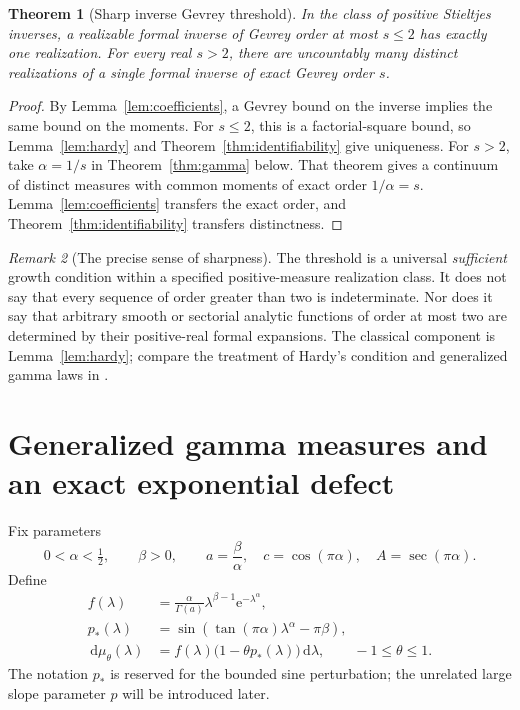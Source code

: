 \documentclass[11pt,a4paper]{article}
\numberwithin{equation}{section}
\newtheorem{theorem}{Theorem}[section]
\theoremstyle{definition}
\theoremstyle{remark}
\newtheorem{remark}[theorem]{Remark}
\newcommand{\dd}{\,\mathrm d}
\newcommand{\ee}{\mathrm e}
\begin{document}
\begin{theorem}[Sharp inverse Gevrey threshold]
\label{thm:gevrey}
In the class of positive Stieltjes inverses, a realizable formal inverse
of Gevrey order at most \(s\le2\) has exactly one realization.
For every real \(s>2\), there are uncountably many distinct realizations
of a single formal inverse of exact Gevrey order \(s\).
\end{theorem}
\begin{proof}
By Lemma~\ref{lem:coefficients}, a Gevrey bound on the inverse implies
the same bound on the moments. For \(s\le2\), this is a factorial-square
bound, so Lemma~\ref{lem:hardy} and
Theorem~\ref{thm:identifiability} give uniqueness. For \(s>2\), take
\(\alpha=1/s\) in Theorem~\ref{thm:gamma} below. That theorem gives a
continuum of distinct measures with common moments of exact order
\(1/\alpha=s\). Lemma~\ref{lem:coefficients} transfers the exact order,
and Theorem~\ref{thm:identifiability} transfers distinctness.
\end{proof}

\begin{remark}[The precise sense of sharpness]
The threshold is a universal \emph{sufficient} growth condition within
a specified positive-measure realization class. It does not say that
every sequence of order greater than two is indeterminate. Nor does it
say that arbitrary smooth or sectorial analytic functions of order at
most two are determined by their positive-real formal expansions.
The classical component is Lemma~\ref{lem:hardy}; compare the treatment
of Hardy's condition and generalized gamma laws in \cite{lin-stoyanov}.
\end{remark}

\section{Generalized gamma measures and an exact exponential defect}
\label{sec:gamma}

Fix parameters
\begin{equation}
 0<\alpha<\tfrac12,\qquad \beta>0,\qquad
 a=\frac\beta\alpha,\quad c=\cos(\pi\alpha),\quad
 A=\sec(\pi\alpha).
 \label{eq:gamma-parameters}
\end{equation}
Define
\begin{align}
 f(\lambda)&=\frac\alpha{\Gamma(a)}\lambda^{\beta-1}
                       \ee^{-\lambda^\alpha},\label{eq:gamma-density}\\
 p_*(\lambda)&=\sin\!\left(\tan(\pi\alpha)\lambda^\alpha-\pi\beta\right),\label{eq:gamma-sine}\\
 \dd\mu_\theta(\lambda)&=f(\lambda)
                \bigl(1-\theta p_*(\lambda)\bigr)\dd\lambda,
 \qquad -1\le\theta\le1.\label{eq:gamma-family}
\end{align}
The notation \(p_*\) is reserved for the bounded sine perturbation;
the unrelated large slope parameter \(p\) will be introduced later.
\end{document}
